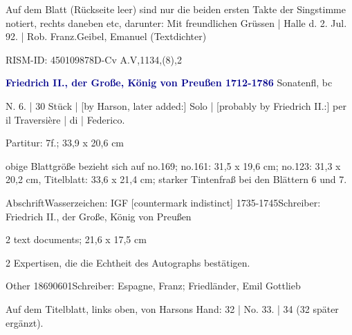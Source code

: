 \documentclass[a4paper, twocolumn, 11pt]{book}
\begin{document}
\newline %
\par Auf dem Blatt (Rückseite leer) sind nur die beiden ersten Takte der Singstimme notiert, rechts daneben {\textquotedbl}etc{\textquotedbl}, darunter: {\textquotedbl}Mit freundlichen Grüssen | Halle d. 2. Jul. 92. | Rob. Franz.{\textquotedbl}\newline Geibel, Emanuel  (Textdichter)
\par RISM-ID: 450109878\newline D-Cv  A.V,1134,(8),2
\par \vspace{16pt} \textcolor{darkblue}{\textbf{Friedrich II., der Große, König von Preußen  1712-1786}}\hfillplus{[32]} Sonaten\newline fl, bc
\par \begin{itshape} N. 6. | 30 Stück | [by Harson, later added:] Solo | [probably by Friedrich II.:] per il Traversière | di | Federico.\end{itshape} 
\par \textcolor{darkblue}{}  Partitur: 7f.; 33,9 x 20,6 cm\newline \begin{small} obige Blattgröße bezieht sich auf no.169; no.161: 31,5 x 19,6 cm; no.123: 31,3 x 20,2 cm, Titelblatt: 33,6 x 21,4 cm; starker Tintenfraß bei den Blättern 6 und 7.\end{small} \newline Abschrift\newline Wasserzeichen: IGF [countermark indistinct]  1735-1745\newline Schreiber: Friedrich II., der Große, König von Preußen
\par \textcolor{darkblue}{}  2 text documents; 21,6 x 17,5 cm\newline \begin{small} 2 Expertisen, die die Echtheit des Autographs bestätigen.\end{small} \newline Other  18690601\newline Schreiber: Espagne, Franz; Friedländer, Emil Gottlieb
\par Auf dem Titelblatt, links oben, von Harsons Hand: {\textquotedbl}32 | No. 33. | 34{\textquotedbl} (32 später ergänzt).
\end{document}
